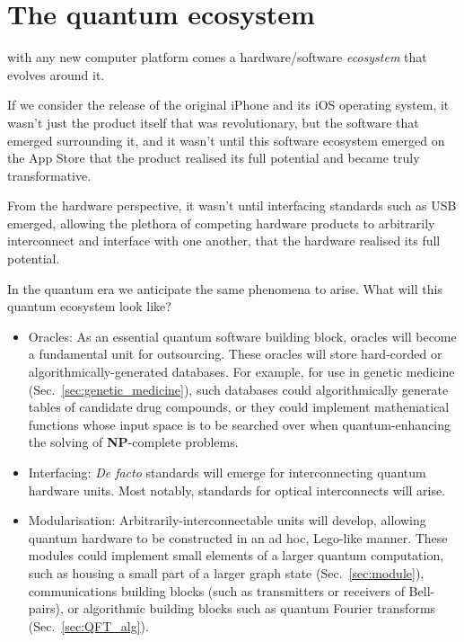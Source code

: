%
%

\section{The quantum ecosystem}

 with any new computer platform comes a hardware/software \textit{ecosystem} that evolves around it.

If we consider the release of the original iPhone and its iOS operating system, it wasn't just the product itself that was revolutionary, but the software that emerged surrounding it, and it wasn't until this software ecosystem emerged on the App Store that the product realised its full potential and became truly transformative.

From the hardware perspective, it wasn't until interfacing standards such as USB emerged, allowing the plethora of competing hardware products to arbitrarily interconnect and interface with one another, that the hardware realised its full potential.

In the quantum era we anticipate the same phenomena to arise. What will this quantum ecosystem look like?

\begin{itemize}
\item Oracles: As an essential quantum software building block, oracles will become a fundamental unit for outsourcing. These oracles will store hard-corded or algorithmically-generated databases. For example, for use in genetic medicine (Sec.~\ref{sec:genetic_medicine}), such databases could algorithmically generate tables of candidate drug compounds, or they could implement mathematical functions whose input space is to be searched over when quantum-enhancing the solving of \textbf{NP}-complete problems.
\item Interfacing: \textit{De facto} standards will emerge for interconnecting quantum hardware units. Most notably, standards for optical interconnects will arise.
\item Modularisation: Arbitrarily-interconnectable units will develop, allowing quantum hardware to be constructed in an ad hoc, Lego-like manner. These modules could implement small elements of a larger quantum computation, such as housing a small part of a larger graph state (Sec.~\ref{sec:module}), communications building blocks (such as transmitters or receivers of Bell-pairs), or algorithmic building blocks such as quantum Fourier transforms (Sec.~\ref{sec:QFT_alg}).
\end{itemize}